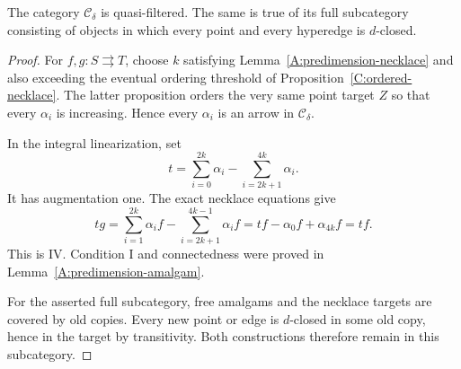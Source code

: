 \begin{proposition}
\label{A:predimension-quasi}
The category $\mathcal C_\delta$ is quasi-filtered. The same is true
of its full subcategory consisting of objects in which every point
and every hyperedge is $d$-closed.
\end{proposition}
\begin{proof}
For $f,g:S\rightrightarrows T$, choose $k$ satisfying
Lemma~\ref{A:predimension-necklace} and also exceeding the eventual
ordering threshold of Proposition~\ref{C:ordered-necklace}. The
latter proposition orders the very same point target $Z$ so that
every $\alpha_i$ is increasing. Hence every $\alpha_i$ is an arrow
in $\mathcal C_\delta$.

In the integral linearization, set
\[
 t=\sum_{i=0}^{2k}\alpha_i-\sum_{i=2k+1}^{4k}\alpha_i.
\]
It has augmentation one. The exact necklace equations give
\[
 tg=\sum_{i=1}^{2k}\alpha_i f
       -\sum_{i=2k+1}^{4k-1}\alpha_i f
    =tf-\alpha_0f+\alpha_{4k}f=tf.
\]
This is IV. Condition I and connectedness were proved in
Lemma~\ref{A:predimension-amalgam}.

For the asserted full subcategory, free amalgams and the necklace
targets are covered by old copies. Every new point or edge is
$d$-closed in some old copy, hence in the target by transitivity.
Both constructions therefore remain in this subcategory.
\end{proof}

